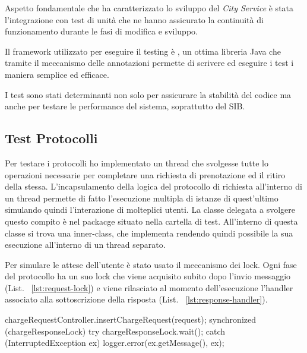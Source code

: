 Aspetto fondamentale che ha caratterizzato lo sviluppo del \emph{City Service} è stata l'integrazione con test di unità che ne hanno assicurato la continuità di funzionamento durante le fasi di modifica e sviluppo.

Il framework utilizzato per eseguire il testing è , un ottima libreria Java che tramite il meccanismo delle annotazioni permette di scrivere ed eseguire i test i maniera semplice ed efficace.

I test sono stati determinanti non solo per assicurare la stabilità del codice ma anche per testare le performance del sistema, soprattutto del SIB. 

\subsection{Test Protocolli}

Per testare i protocolli ho implementato un thread che svolgesse tutte lo operazioni necessarie per completare una richiesta di prenotazione ed il ritiro della stessa. L'incapsulamento della logica del protocollo di richiesta all'interno di un thread permette di fatto l'esecuzione multipla di istanze di quest'ultimo simulando quindi l'interazione di molteplici utenti. La classe delegata a svolgere questo compito è  nel packacge  situato nella cartella di test. All'interno di questa classe si trova una inner-class,  che implementa  rendendo quindi possibile la sua esecuzione all'interno di un thread separato. 

Per simulare le attese dell'utente è stato usato il meccanismo dei lock. Ogni fase del protocollo ha un suo lock che viene acquisito subito dopo l'invio messaggio (List. ~\ref{lst:request-lock}) e viene rilasciato al momento dell'esecuzione l'handler associato alla sottoscrizione della risposta (List. ~\ref{lst:response-handler}).

\begin{java}[caption={Inserimento della \code{CargeRequest} e attesa della risposta},label={lst:request-lock}]
chargeRequestController.insertChargeRequest(request);
synchronized (chargeResponseLock) {
	try {
		chargeResponseLock.wait();
	} catch (InterruptedException ex) {
		logger.error(ex.getMessage(), ex);
	}
}
\end{java}

